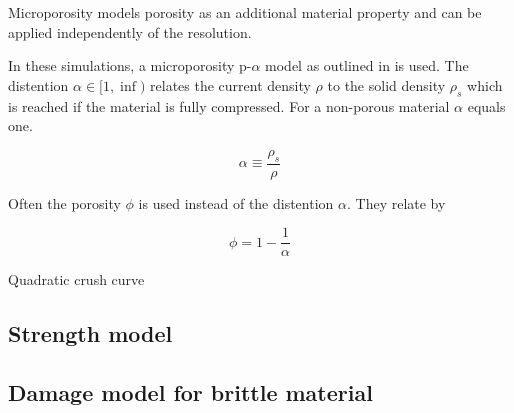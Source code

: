 Microporosity models porosity as an additional material property and can be applied independently of the resolution.


In these simulations, a microporosity p-$\alpha$ model as outlined in \cite{Jutzi_2008} is used. The distention $\alpha \in [1,\inf)$ relates the current density $\rho$ to the solid density $\rho_s$ which is reached if the material is fully compressed. For a non-porous material $\alpha$ equals one.

\begin{equation}
    \alpha \equiv \frac{\rho_s}{\rho}
\end{equation}

Often the porosity $\phi$ is used instead of the distention $\alpha$. They relate by

\begin{equation}
    \phi = 1 - \frac{1}{\alpha}
\end{equation}

Quadratic crush curve
\subsection{Strength model}

\subsection{Damage model for brittle material}